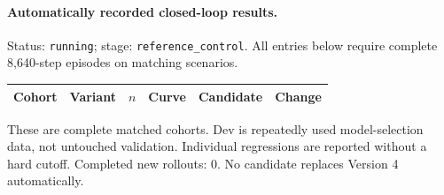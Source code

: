 \paragraph{Automatically recorded closed-loop results.}
Status: \texttt{running}; stage: \texttt{reference\_control}.
All entries below require complete 8,640-step episodes on matching scenarios.
\begin{center}\small
\begin{tabular}{llrrrr}\toprule
Cohort & Variant & $n$ & Curve & Candidate & Change \\\midrule
\bottomrule\end{tabular}\end{center}
These are complete matched cohorts. Dev is repeatedly used model-selection data, not untouched validation. Individual regressions are reported without a hard cutoff.
Completed new rollouts: 0. No candidate replaces Version 4 automatically.
